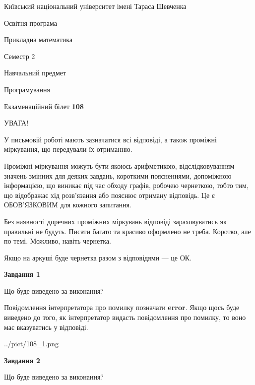 \documentclass[12pt, ukrainian]{article}
\begin{document}
{{\begin {small}\par
{ \center  Київський національний університет імені Тараса Шевченка \par}
{\parbox {5 cm}{Освітня програма \hfill}{\parbox {7 cm}{Прикладна математика \hfill}}\parbox {6 cm}{\hfill Семестр 2}}\par
{\parbox {5 cm} {Навчальний предмет \hfill}\parbox {7 cm}{Програмування \hfill}\parbox {6cm}{\hfill}\par}\vspace{-7pt} \end{small}}{\center Екзаменаційний білет \No \textbf
{ 108 }\par}}
{
\begin {large}
УВАГА!

У письмовій роботі мають зазначатися всі відповіді, а також проміжні міркування, що передували їх отриманню.

Проміжні міркування можуть бути якоюсь арифметикою, відслідковуванням зна\-чень змінних для деяких завдань,
короткими поясненнями, допоміжною інформацією, що виникає під час обходу графів, робочею чернеткою,
тобто тим, що відображає хід розв’язання або пояснює отриману відповідь.
Це є ОБОВ’ЯЗКОВИМ для кожного запитання.

Без наявності доречних проміжних міркувань відповіді зараховуватись як правиль\-ні не будуть.
Писати багато та красиво оформлено не треба. Коротко, але по темі. Можли\-во, навіть чернетка.

Якщо на аркуші буде чернетка разом з відповідями --- це ОК.

\newpage

{\begin {center}\textbf{Завдання 1}\end {center}}\par
Що буде виведено за виконання?

Повідомлення інтерпретатора про помилку позначати \textbf{error}.
Якщо щось буде виведено до того, як інтерпретатор видасть повідомлення про помилку, 
то воно має вказуватись у відповіді. \par


\begin{center}
	{../pict/108_1.png}
\end{center}
\newpage

{\begin {center}\textbf{Завдання 2}\end {center}}\par
Що буде виведено за виконання?


\end{large}}
\end{document}
